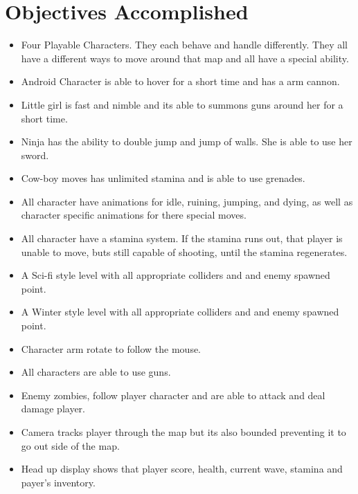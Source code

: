 \documentclass{article}
\begin{document}
\section{Objectives Accomplished}
\begin{itemize}
\item Four Playable Characters.  They each behave and handle differently. They all have a different ways to move around that map and all have a special ability. 

\item Android Character is able to hover for a short time and has a arm cannon. 

\item Little girl is fast and nimble and its able to summons guns around her for a short time. 

\item Ninja has the ability to double jump and jump of walls. She is able to use her sword. 

\item Cow-boy moves has unlimited stamina and is able to use grenades. 

\item All character have animations for idle, ruining, jumping, and dying, as well as character specific animations for there special moves. 

\item All character have a stamina system. If the stamina runs out, that player is unable to move, buts still capable of shooting, until the stamina regenerates.

\item A Sci-fi style level with all appropriate colliders and and enemy spawned point.

\item A Winter style level with all appropriate colliders and and enemy spawned point.

\item Character arm rotate to follow the mouse.

\item All characters are able to use guns. 

\item Enemy zombies, follow player character and are able to attack and deal damage player. 

\item Camera tracks player through the map but its also bounded preventing it to go out side of the map. 

\item Head up display shows that player score, health, current wave, stamina and payer's inventory. 


\end{itemize}
\end{document}
